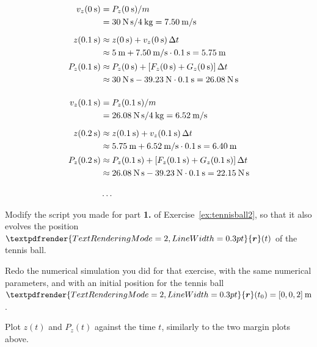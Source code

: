 \documentclass[a4paper,12pt,%
onecolumn,oneside,titlepage,%
british%
]{memoir}
\renewcommand*{\bm}[1]{\textpdfrender{TextRenderingMode=2,LineWidth=0.3pt}{\boldsymbol{#1}}}
\newcommand*{\incr}{\Delta}%
\renewcommand*{\|}[1][]{\nonscript\:#1\vert\nonscript\:\mathopen{}}
\newcommand*{\yr}{\bm{r}}
\newcommand*{\yti}{t_{0}}
\newcommand*{\Dt}{\incr t}
\newcommand*{\yM}{m}%
\begin{document}
\begin{equation*}
  \begin{aligned}
    v_{z}(\qty{0}{s}) &= P_{z}(\qty{0}{s})/\yM\\
    &=\qty{30}{N\,s}/\qty{4}{kg} = \qty{7.50}{m/s}
    \\[2\jot]
    z(\qty{0.1}{s})  &\approx z(\qty{0}{s}) + v_{z}(\qty{0}{s})\,\Dt\\
    &\approx \qty{5}{m} + \qty{7.50}{m/s}\cdot\qty{0.1}{s} = \qty{5.75}{m}
    \\[0.5\jot]
    P_{z}(\qty{0.1}{s})  &\approx P_{z}(\qty{0}{s}) + [F_{z}(\qty{0}{s}) + G_{z}(\qty{0}{s})]\,\Dt \\
    &\approx\qty{30}{N\,s} -\qty{39.23}{N}\cdot\qty{0.1}{s} = \qty{26.08}{N\,s}
    \\[4\jot]
    v_{z}(\qty{0.1}{s}) &= P_{z}(\qty{0.1}{s})/\yM\\
    &=\qty{26.08}{N\,s}/\qty{4}{kg} = \qty{6.52}{m/s}
    \\[2\jot]
    z(\qty{0.2}{s})  &\approx z(\qty{0.1}{s}) + v_{z}(\qty{0.1}{s})\,\Dt\\
    &\approx \qty{5.75}{m} + \qty{6.52}{m/s}\cdot\qty{0.1}{s} = \qty{6.40}{m}
    \\[0.5\jot]
    P_{z}(\qty{0.2}{s})  &\approx P_{z}(\qty{0.1}{s}) + [F_{z}(\qty{0.1}{s}) + G_{z}(\qty{0.1}{s})]\,\Dt\\
    &\approx\qty{26.08}{N\,s} -\qty{39.23}{N}\cdot\qty{0.1}{s} = \qty{22.15}{N\,s}
    \\[3\jot]
    &\dotso
  \end{aligned}
\end{equation*}

\begin{exercise}[label={ex:tennisball3}]
  Modify the script you made for part \textbf{1.} of Exercise~\ref{ex:tennisball2}, so that it also evolves the position $\yr(t)$ of the tennis ball.

  Redo the numerical simulation you did for that exercise, with the same numerical parameters, and with an initial position for the tennis ball $\yr(\yti) = [0,0,2]\:\unit{m}$.

  Plot $z(t)$ and $P_{z}(t)$ against the time $t$, similarly to the two margin plots above.
\end{exercise}
\end{document}
